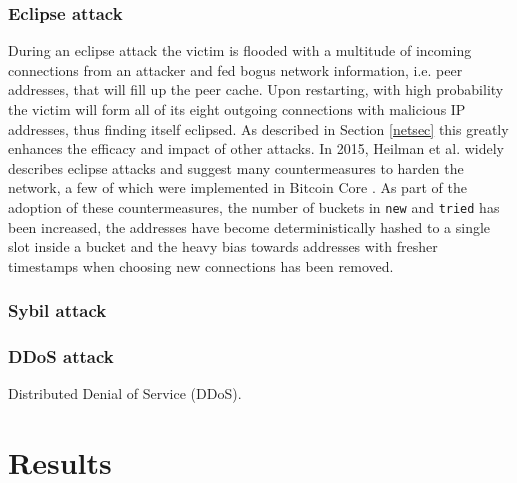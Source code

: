 \documentclass[12pt, letterpaper, twoside]{article}
\begin{document}
\subsubsection{Eclipse attack}\label{eclipse}
During an eclipse attack the victim is flooded with a multitude of incoming connections from an attacker and fed bogus network information, i.e. peer addresses, that will fill up the peer cache. Upon restarting, with high probability the victim will form all of its eight outgoing connections with malicious IP addresses, thus finding itself eclipsed. As described in Section \ref{netsec} this greatly enhances the efficacy and impact of other attacks. In 2015, Heilman et al. widely describes eclipse attacks and suggest many countermeasures to harden the network, a few of which were implemented in Bitcoin Core \cite{eclipseatk}. As part of the adoption of these countermeasures, the number of buckets in \texttt{new} and \texttt{tried} has been increased, the addresses have become deterministically hashed to a single slot inside a bucket and the heavy bias towards addresses with fresher timestamps when choosing new connections has been removed.

\subsubsection{Sybil attack}\label{sybil}

\subsubsection{DDoS attack}\label{ddos}
Distributed Denial of Service (DDoS).

\section{Results}\label{res}




















\end{document}
